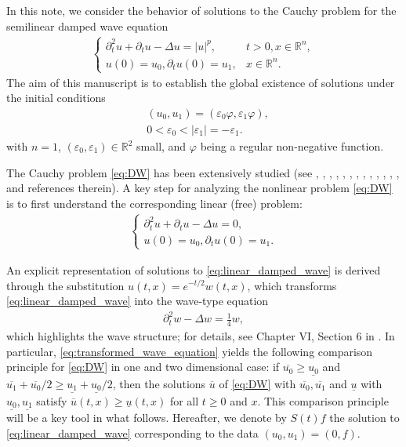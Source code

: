 \documentclass[reqno]{amsart}
\begin{document}
In this note,
we consider the behavior of solutions
to the Cauchy problem for the semilinear damped wave equation
	\begin{align}\label{eq:DW}
	\begin{cases}
    \partial_t^2 u+\partial_t u-\Delta u=|u|^p, & t>0, x \in \mathbb R^n, \\
    u(0)=u_0, \partial_t u(0)=u_1, & x \in \mathbb R^n .
	\end{cases}
	\end{align}
The aim of this manuscript
is to establish the global existence of solutions
under the initial conditions
	\begin{align}\label{eq:initial_condition}
    & \left(u_0, u_1\right)=\left(\varepsilon_0 \varphi, \varepsilon_1 \varphi\right), \\
    & 0 < \varepsilon_0 < |\varepsilon_1| = - \varepsilon_1.
	\end{align}
with $n = 1$, $\left(\varepsilon_0, \varepsilon_1\right) \in \mathbb{R}^2$ small,
and $\varphi$ being a regular non-negative function.

The Cauchy problem \eqref{eq:DW} has been extensively studied
(see
	\cite{M76},
	\cite{TY01},
	\cite{N03},
	\cite{MN03},
	\cite{HKN04},
	\cite{INZ06},
	\cite{DA15},
	\cite{DLR15}
	\cite{IIOW19},
	\cite{FIW19},
	\cite{LT19},
	\cite{IS19},
	\cite{CR21},
	\cite{KK22},
and references therein).
A key step for analyzing the nonlinear problem \eqref{eq:DW} is to first
understand the corresponding linear (free) problem:
	\begin{align}
	\begin{cases}
	\partial_t^2 u + \partial_t u - \Delta u = 0,\\
	u(0) = u_0,
	\partial_t u(0) = u_1.
	\end{cases}
	\label{eq:linear_damped_wave}
	\end{align}
 
An explicit representation of solutions to \eqref{eq:linear_damped_wave}
is derived through the substitution $u(t,x)=e^{-t/2}w(t,x)$,
which transforms
\eqref{eq:linear_damped_wave} into the wave-type equation
	\begin{align}
	\partial_t^2 w - \Delta w = \frac{1}{4} w,
	\label{eq:transformed_wave_equation}
	\end{align}
which highlights the wave structure; for details, see Chapter VI, Section 6 in  \cite{CH89}.
In particular, \eqref{eq:transformed_wave_equation} yields the following
comparison principle for \eqref{eq:DW} in one and two dimensional case:
if $\overline{u_0} \geq \underline{u_0} $
and $\overline{u_1} + \overline{u_0}/2 \geq \underline{u_1} + \underline{u_0}/2$,
then the solutions $\overline{u}$ of \eqref{eq:DW}
with $\overline{u_0}, \overline{u_1}$
and $\underline{u}$ with $\underline{u_0}, \underline{u_1}$
satisfy $\overline{u}(t,x) \geq \underline{u}(t,x)$ for all $t \geq 0$ and $x$.
This comparison principle will be a key tool in what follows.
Hereafter, we denote by $S(t)f$ the solution to \eqref{eq:linear_damped_wave}
corresponding to the data $(u_0,u_1)=(0,f)$.
\end{document}

